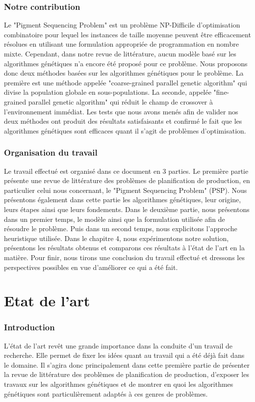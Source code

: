 \documentclass[12pt,a4paper]{article}
\begin{document}
	\section*{Notre contribution}
	Le "Pigment Sequencing Problem" est un problème NP-Difficile d'optimisation combinatoire pour lequel les instances de taille moyenne peuvent être efficacement résolues en utilisant une formulation appropriée de programmation en nombre mixte. Cependant, dans notre revue de littérature, aucun modèle basé sur les algorithmes génétiques n'a encore été proposé pour ce problème. Nous proposons donc deux méthodes basées sur les algorithmes génétiques pour le problème. La première est une méthode appelée "coarse-grained parallel genetic algorithm" qui divise la population globale en sous-populations. La seconde, appelée "fine-grained parallel genetic algorithm" qui réduit le champ de crossover à l'environnement immédiat. Les tests que nous avons menés afin de valider nos deux méthodes ont produit des résultats satisfaisants et confirmé le fait que les algorithmes génétiques sont efficaces quant il s'agit de problèmes d'optimisation.  
	\section*{Organisation du travail}

	Le travail effectué est organisé dans ce document en 3 parties. Le première partie présente une revue de littérature des problèmes de planification de production, en particulier celui nous concernant, le "Pigment Sequencing Problem" (PSP). Nous présentons également dans cette partie les algorithmes génétiques, leur origine, leurs étapes ainsi que leurs fondements. Dans le deuxième partie, nous présentons dans un premier temps, le modèle ainsi que la formulation utilisée afin de résoudre le problème. Puis dans un second temps, nous explicitons l'approche heuristique utilisée. Dans le chapitre 4, nous expérimentons  notre solution, présentons les résultats obtenus et comparons ces résultats à l'état de l'art en la matière. Pour finir, nous tirons une conclusion du travail effectué et dressons les perspectives possibles en vue d'améliorer ce qui a été fait.
	
	\newpage
	
	\part{Etat de l'art}
		\section*{Introduction}
		L'état de l'art revêt une grande importance dans la conduite d'un travail de recherche. Elle permet de fixer les idées quant au travail qui a été déjà fait dans le domaine. Il s'agira donc principalement dans cette première partie de présenter la revue de littérature des problèmes de planification de production, d'exposer les travaux sur les algorithmes génétiques et de montrer en quoi les algorithmes génétiques sont particulièrement adaptés à ces genres de problèmes.
		
\end{document}
